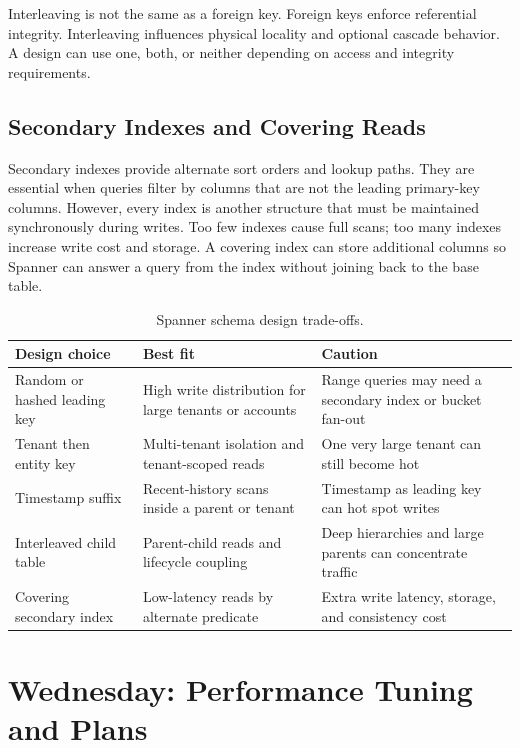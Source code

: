 \begin{notebox}
Interleaving is not the same as a foreign key. Foreign keys enforce referential integrity. Interleaving influences physical locality and optional cascade behavior. A design can use one, both, or neither depending on access and integrity requirements.
\end{notebox}

\subsection{Secondary Indexes and Covering Reads}
Secondary indexes provide alternate sort orders and lookup paths. They are essential when queries filter by columns that are not the leading primary-key columns. However, every index is another structure that must be maintained synchronously during writes. Too few indexes cause full scans; too many indexes increase write cost and storage. A covering index can store additional columns so Spanner can answer a query from the index without joining back to the base table.

\begin{table}[H]
\centering
\small
\begin{tabular}{@{}p{3.0cm}p{4.8cm}p{4.8cm}@{}}
\toprule
\textbf{Design choice} & \textbf{Best fit} & \textbf{Caution} \\
\midrule
Random or hashed leading key & High write distribution for large tenants or accounts & Range queries may need a secondary index or bucket fan-out \\
Tenant then entity key & Multi-tenant isolation and tenant-scoped reads & One very large tenant can still become hot \\
Timestamp suffix & Recent-history scans inside a parent or tenant & Timestamp as leading key can hot spot writes \\
Interleaved child table & Parent-child reads and lifecycle coupling & Deep hierarchies and large parents can concentrate traffic \\
Covering secondary index & Low-latency reads by alternate predicate & Extra write latency, storage, and consistency cost \\
\bottomrule
\end{tabular}
\caption{Spanner schema design trade-offs.}
\label{tab:spanner-schema-tradeoffs}
\end{table}

\section{Wednesday: Performance Tuning and Plans}


